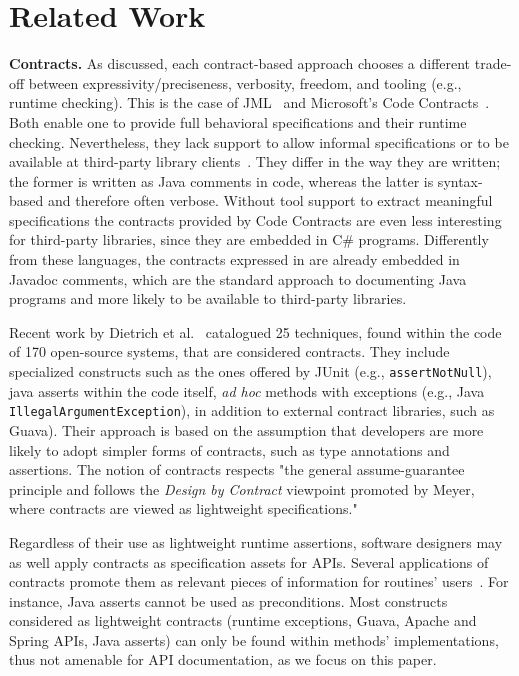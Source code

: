 \section{Related Work}
\label{sec:relatedWork}

\textbf{Contracts.} 
As discussed, each contract-based approach choo\-ses a different trade-off between expressivity/preciseness, verbosity, freedom, and tooling (e.g., runtime checking).
This is the case of JML~\cite{jml} and Microsoft's Code Contracts~\cite{codeContractsPaper}.
Both enable one to provide full behavioral specifications and their runtime checking.
Nevertheless, they lack support to allow informal specifications or to be available at third-party
library clients~\cite{Parnas2011}. They differ in the way they are written; the former is written as Java comments in code, whereas the latter is syntax-based and therefore often verbose. 
Without tool support to extract meaningful specifications the contracts provided by Code Contracts are even less interesting for third-party libraries, since they are embedded in C\# programs. Differently from these languages, the contracts expressed in \contractjdoc{} are already embedded in Javadoc comments, which are the standard approach to documenting Java programs and more likely to be available to third-party libraries.

Recent work by Dietrich et al.~\cite{Dietrich2017} catalogued 25 techniques, found within the code of 170 open-source systems, that are considered contracts. They include specialized constructs such as the ones offered by JUnit (e.g., \texttt{assertNotNull}), java asserts within the code itself, \emph{ad hoc} methods with exceptions (e.g., Java \texttt{IllegalArgumentException}), in addition to external contract libraries, such as Guava). 
Their approach is based on the assumption that developers are more likely to adopt simpler forms of contracts, such as type annotations and assertions. The notion of contracts respects "the general assume-guarantee principle and follows the \emph{Design by Contract} viewpoint promoted by Meyer, where contracts are viewed as lightweight specifications."~\cite{dbc} 

Regardless of their use as lightweight runtime assertions, software designers may as well apply contracts as specification assets for APIs. Several applications of contracts promote them as relevant pieces of information for routines' users~\cite{docAnalysis}. For instance, Java asserts cannot be used as preconditions. Most constructs considered as lightweight contracts (runtime exceptions, Guava, Apache and Spring APIs, Java asserts) can only be found within methods' implementations, thus not amenable for API documentation, as we focus on this paper.

